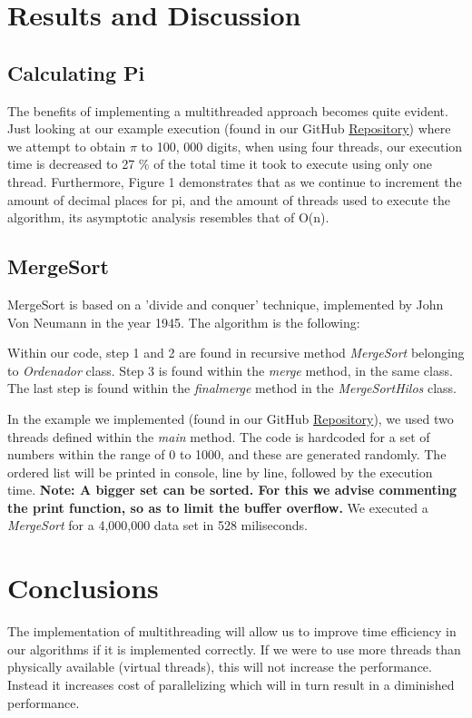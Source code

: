 \documentclass[10pt,a4paper]{article}
\theoremstyle{definition}
\begin{document}
\section{Results and Discussion}
\subsection{Calculating Pi}

The benefits of implementing a multithreaded approach becomes quite evident. Just looking at our example execution (found in our GitHub \href{https://github.com/ezevallos/CC462_EjemplosConcurrencia}{Repository}) where we attempt to obtain \(\pi\) to 100, 000 digits, when using four threads, our execution time is decreased to 27 \% of the total time it took to execute using only one thread. Furthermore, Figure 1 demonstrates that as we continue to increment the amount of decimal places for pi, and the amount of threads used to execute the algorithm, its asymptotic analysis resembles that of O(n).

\subsection{MergeSort}
MergeSort is based on a 'divide and conquer' technique, implemented by John Von Neumann in the year 1945. The algorithm is the following:

Within our code, step 1 and 2 are found in recursive method \emph{MergeSort} belonging to \emph{Ordenador} class. Step 3 is found within the \emph{merge} method, in the same class. The last step is found within the \emph{finalmerge} method in the \emph{MergeSortHilos} class.

In the example we implemented (found in our GitHub \href{https://github.com/ezevallos/CC462_Battle-City}{Repository}), we used two threads defined within the \emph{main} method. The code is hardcoded for a set of numbers within the range of 0 to 1000, and these are generated randomly. The ordered list will be printed in console, line by line, followed by the execution time. \textbf{Note: A bigger set can be sorted. For this we advise commenting the print function, so as to limit the buffer overflow.} We executed a \emph{MergeSort} for a 4,000,000 data set in 528 miliseconds. 

\section{Conclusions}
The implementation of multithreading will allow us to improve time efficiency in our algorithms if it is implemented correctly. If we were to use more threads than physically available (virtual threads), this will not increase
the performance. Instead it increases cost of parallelizing which will in turn result in a diminished performance.
\end{document}
